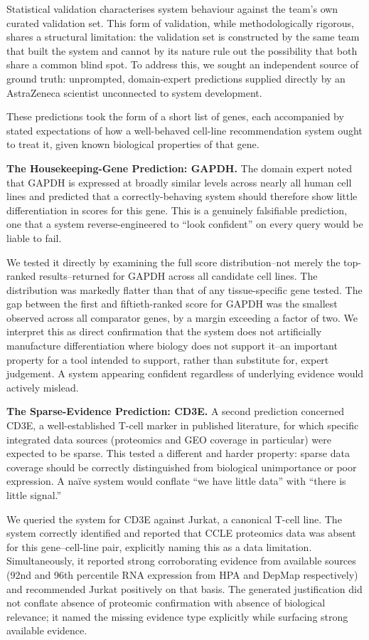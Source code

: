 \documentclass[author={Karen Coutinho, Ishaan Bhalla, Aman Raj, Dixit Kaloorani Malarmannan},
                supervisor={Dr. Daniel D'Andrea},
                degree={MSc},
                title={CellSelector Omics: A Multi-Omics Recommendation System for Cell Line Selection},
                subtitle={},
                type={},
                year={2026}]{dissertation}
\begin{document}
Statistical validation characterises system behaviour against the team's own curated validation set. This form of validation, while methodologically rigorous, shares a structural limitation: the validation set is constructed by the same team that built the system and cannot by its nature rule out the possibility that both share a common blind spot. To address this, we sought an independent source of ground truth: unprompted, domain-expert predictions supplied directly by an AstraZeneca scientist unconnected to system development.

These predictions took the form of a short list of genes, each accompanied by stated expectations of how a well-behaved cell-line recommendation system ought to treat it, given known biological properties of that gene.

{\bf The Housekeeping-Gene Prediction: GAPDH.} The domain expert noted that GAPDH is expressed at broadly similar levels across nearly all human cell lines and predicted that a correctly-behaving system should therefore show little differentiation in scores for this gene. This is a genuinely falsifiable prediction, one that a system reverse-engineered to ``look confident'' on every query would be liable to fail.

We tested it directly by examining the full score distribution--not merely the top-ranked results--returned for GAPDH across all candidate cell lines. The distribution was markedly flatter than that of any tissue-specific gene tested. The gap between the first and fiftieth-ranked score for GAPDH was the smallest observed across all comparator genes, by a margin exceeding a factor of two. We interpret this as direct confirmation that the system does not artificially manufacture differentiation where biology does not support it--an important property for a tool intended to support, rather than substitute for, expert judgement. A system appearing confident regardless of underlying evidence would actively mislead.

{\bf The Sparse-Evidence Prediction: CD3E.} A second prediction concerned CD3E, a well-established T-cell marker in published literature, for which specific integrated data sources (proteomics and GEO coverage in particular) were expected to be sparse. This tested a different and harder property: sparse data coverage should be correctly distinguished from biological unimportance or poor expression. A naïve system would conflate ``we have little data'' with ``there is little signal.''

We queried the system for CD3E against Jurkat, a canonical T-cell line. The system correctly identified and reported that CCLE proteomics data was absent for this gene–cell-line pair, explicitly naming this as a data limitation. Simultaneously, it reported strong corroborating evidence from available sources (92nd and 96th percentile RNA expression from HPA and DepMap respectively) and recommended Jurkat positively on that basis. The generated justification did not conflate absence of proteomic confirmation with absence of biological relevance; it named the missing evidence type explicitly while surfacing strong available evidence.
\end{document}
